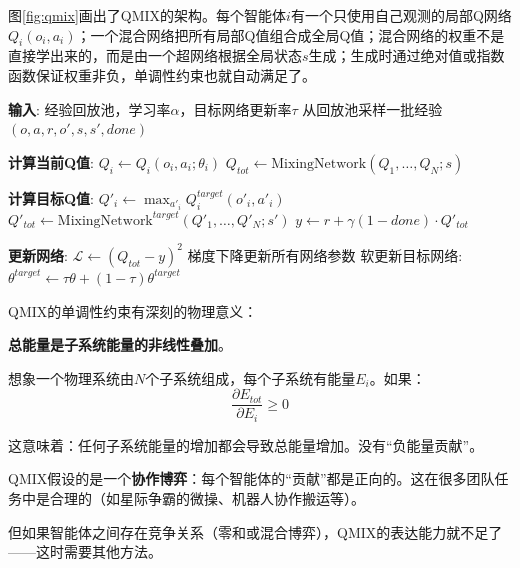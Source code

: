 图\ref{fig:qmix}画出了QMIX的架构。每个智能体$i$有一个只使用自己观测的局部Q网络$Q_i(o_i, a_i)$；一个混合网络把所有局部Q值组合成全局Q值；混合网络的权重不是直接学出来的，而是由一个超网络根据全局状态$s$生成；生成时通过绝对值或指数函数保证权重非负，单调性约束也就自动满足了。

\begin{algorithm}
\caption{QMIX训练流程（伪代码）}
\begin{algorithmic}[1]
\State \textbf{输入}: 经验回放池，学习率$\alpha$，目标网络更新率$\tau$
    \State 从回放池采样一批经验 $(o, a, r, o', s, s', done)$
    \State {}

    \State \textbf{计算当前Q值}:
        \State $Q_i \leftarrow Q_i(o_i, a_i; \theta_i)$ 
    \EndFor
    \State $Q_{tot} \leftarrow \text{MixingNetwork}(Q_1, \ldots, Q_N; s)$ 

    \State \textbf{计算目标Q值}:
        \State $Q'_i \leftarrow \max_{a'_i} Q^{target}_i(o'_i, a'_i)$ 
    \EndFor
    \State $Q'_{tot} \leftarrow \text{MixingNetwork}^{target}(Q'_1, \ldots, Q'_N; s')$
    \State $y \leftarrow r + \gamma (1 - done) \cdot Q'_{tot}$ 

    \State \textbf{更新网络}:
    \State $\mathcal{L} \leftarrow (Q_{tot} - y)^2$ 
    \State 梯度下降更新所有网络参数
    \State 软更新目标网络: $\theta^{target} \leftarrow \tau \theta + (1-\tau) \theta^{target}$
\EndFor
\end{algorithmic}
\end{algorithm}

\begin{physicalintuition}
QMIX的单调性约束有深刻的物理意义：

\textbf{总能量是子系统能量的非线性叠加}。

想象一个物理系统由$N$个子系统组成，每个子系统有能量$E_i$。如果：
\begin{equation}
    \frac{\partial E_{tot}}{\partial E_i} \geq 0
\end{equation}

这意味着：任何子系统能量的增加都会导致总能量增加。没有“负能量贡献”。

QMIX假设的是一个\textbf{协作博弈}：每个智能体的“贡献”都是正向的。这在很多团队任务中是合理的（如星际争霸的微操、机器人协作搬运等）。

但如果智能体之间存在竞争关系（零和或混合博弈），QMIX的表达能力就不足了——这时需要其他方法。
\end{physicalintuition}

